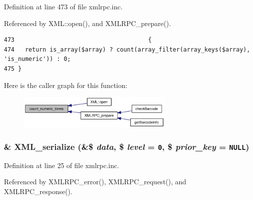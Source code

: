 Definition at line 473 of file xmlrpc.inc.

Referenced by XML::open(), and XMLRPC\_\-prepare().

\begin{Code}\begin{verbatim}473                                      {
474   return is_array($array) ? count(array_filter(array_keys($array), 'is_numeric')) : 0;
475 }
\end{verbatim}
\end{Code}




Here is the caller graph for this function:\nopagebreak
\begin{figure}[H]
\begin{center}
\leavevmode
\includegraphics[width=215pt]{xmlrpc_8inc_88839ba2c5c835c99f55578c65faa401_icgraph}
\end{center}
\end{figure}
\hypertarget{xmlrpc_8inc_a1e9b05a06f28fabb86c10129f5890ef}{
\subsubsection{\setlength{\rightskip}{0pt plus 5cm}\& XML\_\-serialize (\&\$ {\em data}, \$ {\em level} = {\tt 0}, \$ {\em prior\_\-key} = {\tt NULL})}}
\label{xmlrpc_8inc_a1e9b05a06f28fabb86c10129f5890ef}




Definition at line 25 of file xmlrpc.inc.

Referenced by XMLRPC\_\-error(), XMLRPC\_\-request(), and XMLRPC\_\-response().

